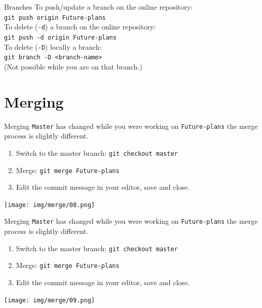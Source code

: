 \documentclass[usenames,dvipsnames,9pt]{beamer}
\begin{document}
%
\begin{frame}{Branches}
  \centering
  To push/update a branch on the online repository:\\
  \lstinline|git push origin Future-plans|\\
  \vspace{1cm}
  To delete (\lstinline|-d|) a branch on the online repository:\\
  \lstinline|git push -d origin Future-plans|\\
  \vspace{1cm}
  To delete (\lstinline|-D|) locally a branch:\\
  \lstinline|git branch -D <branch-name>|\\
  (Not possible while you are on that branch.)
\end{frame}



%
%
\section{Merging}

%
\begin{frame}{Merging}
  \texttt{Master} has changed while you were working on \texttt{Future-plans} the merge process is slightly different.
  \begin{enumerate}
    \item Switch to the master branch: \lstinline|git checkout master|
    \item Merge: \lstinline|git merge Future-plans|
    \item Edit the commit message in your editor, save and close.
  \end{enumerate}
  \texttt{[image: img/merge/08.png]}
\end{frame}

%
\begin{frame}{Merging}
  \texttt{Master} has changed while you were working on \texttt{Future-plans} the merge process is slightly different.
  \begin{enumerate}
    \item Switch to the master branch: \lstinline|git checkout master|
    \item Merge: \lstinline|git merge Future-plans|
    \item Edit the commit message in your editor, save and close.
  \end{enumerate}
  \texttt{[image: img/merge/09.png]}
\end{frame}
\end{document}
